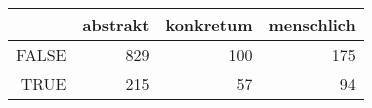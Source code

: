 \begin{tabular}{rrrr}
  \hline
 & abstrakt & konkretum & menschlich \\ 
  \hline
FALSE & 829 & 100 & 175 \\ 
  TRUE & 215 &  57 &  94 \\ 
   \hline
\end{tabular}
